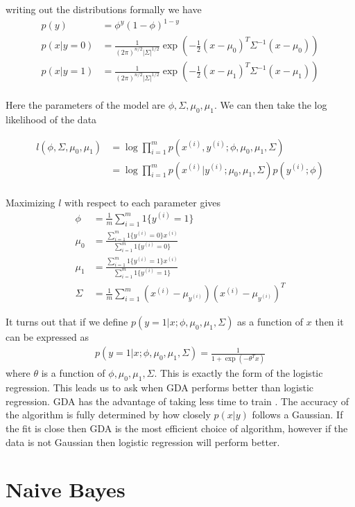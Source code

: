 \documentclass[11pt]{exam}
\newcommand{\idx}[2]{#1^{(#2)}}
\newcommand{\idctr}[1]{1\{#1\}}
\begin{document}
writing out the distributions formally we have
\begin{align*}
p(y) &= \phi^y(1-\phi)^{1-y}\\
p(x|y=0) &=  \frac{1}{(2\pi)^{n/2} |\Sigma|^{1/2}} \exp(-\frac{1}{2}(x - \mu_0)^T \Sigma^{-1}(x - \mu_0))\\
p(x|y=1) &=  \frac{1}{(2\pi)^{n/2} |\Sigma|^{1/2}} \exp(-\frac{1}{2}(x - \mu_1)^T \Sigma^{-1}(x - \mu_1))\\
\end{align*}

Here the parameters of the model are $\phi,\Sigma,\mu_0,\mu_1$. We can then take the log likelihood of the data

\begin{align*}
l(\phi,\Sigma,\mu_0,\mu_1) &= \log \prod_{i=1}^m p(\idx{x}{i},\idx{y}{i}; \phi,\mu_0,\mu_1,\Sigma)\\
&= \log \prod_{i=1}^m p(\idx{x}{i}|\idx{y}{i};\mu_0,\mu_1,\Sigma)p(\idx{y}{i};\phi)\\
\end{align*}

Maximizing $l$ with respect to each parameter gives
\begin{align*}
\phi &= \frac{1}{m} \sum_{i=1}^m \idctr{\idx{y}{i} = 1}\\
\mu_0 &= \frac{\sum_{i=1}^m \idctr{\idx{y}{i} = 0} \idx{x}{i}}{\sum_{i=1}^m \idctr{\idx{y}{i} = 0}}\\
\mu_1 &= \frac{\sum_{i=1}^m \idctr{\idx{y}{i} = 1} \idx{x}{i}}{\sum_{i=1}^m \idctr{\idx{y}{i} = 1}}\\
\Sigma &= \frac{1}{m} \sum_{i=1}^m (\idx{x}{i} - \mu_{\idx{y}{i}})(\idx{x}{i} - \mu_{\idx{y}{i}})^T
\end{align*}

It turns out that if we define $p(y=1|x;\phi,\mu_0,\mu_1,\Sigma)$ as a function of $x$ then it can be expressed as
\begin{align*}
p(y=1|x;\phi,\mu_0,\mu_1,\Sigma) = \frac{1}{1+\exp(-\theta^Tx)}
\end{align*}
where $\theta$ is a function of $\phi,\mu_0,\mu_1,\Sigma$. This is exactly the form of the logistic regression. This leads us to ask when GDA performs better than logistic regression. GDA has the advantage of taking less time to train . The accuracy of the algorithm is fully determined by how closely $p(x|y)$ follows a Gaussian. If the fit is close then GDA is the most efficient choice of algorithm, however if the data is not Gaussian then logistic regression will perform better.

\section{Naive Bayes}
\end{document}
